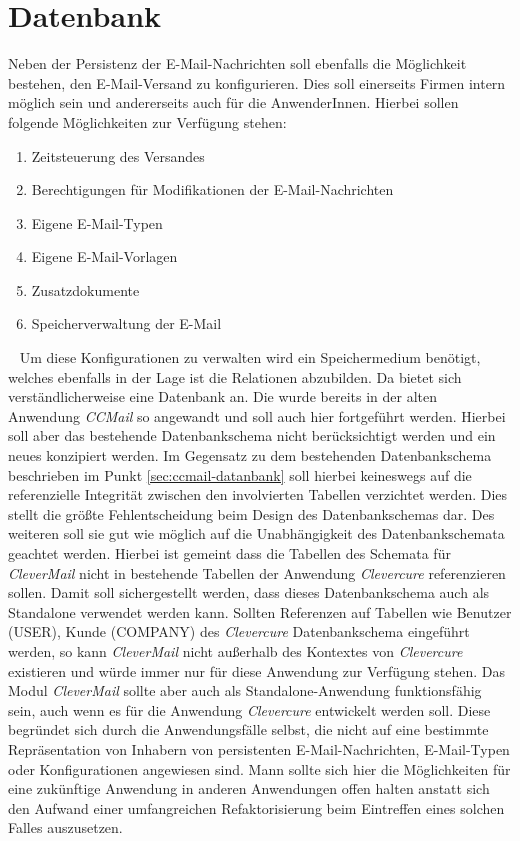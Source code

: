 \chapter{Datenbank}
Neben der Persistenz der E-Mail-Nachrichten soll ebenfalls die Möglichkeit bestehen, den E-Mail-Versand zu konfigurieren. Dies soll einerseits Firmen intern möglich sein und andererseits auch für die AnwenderInnen. Hierbei sollen folgende Möglichkeiten zur Verfügung stehen:
\begin{enumerate}
	\item Zeitsteuerung des Versandes
	\item Berechtigungen für Modifikationen der E-Mail-Nachrichten
	\item Eigene E-Mail-Typen
	\item Eigene E-Mail-Vorlagen
	\item Zusatzdokumente 
	\item Speicherverwaltung der E-Mail
\end{enumerate}
\ \newline
Um diese Konfigurationen zu verwalten wird ein Speichermedium benötigt, welches ebenfalls in der Lage ist die Relationen abzubilden. Da bietet sich verständlicherweise eine Datenbank an. Die wurde bereits in der alten Anwendung \emph{CCMail} so angewandt und soll auch hier fortgeführt werden. Hierbei soll aber das bestehende Datenbankschema nicht berücksichtigt werden und ein neues konzipiert werden. Im Gegensatz zu dem bestehenden Datenbankschema beschrieben im Punkt \ref{sec:ccmail-datanbank} soll hierbei keineswegs auf die referenzielle Integrität zwischen den involvierten Tabellen verzichtet werden. Dies stellt die größte Fehlentscheidung beim Design des Datenbankschemas dar. Des weiteren soll sie gut wie möglich auf die Unabhängigkeit des Datenbankschemata geachtet werden. Hierbei ist gemeint dass die Tabellen des Schemata für \emph{CleverMail} nicht in bestehende Tabellen der Anwendung \emph{Clevercure} referenzieren sollen. Damit soll sichergestellt werden, dass dieses Datenbankschema auch als Standalone verwendet werden kann. Sollten Referenzen auf Tabellen wie Benutzer (USER), Kunde (COMPANY) des \emph{Clevercure} Datenbankschema eingeführt werden, so kann \emph{CleverMail} nicht außerhalb des Kontextes von \emph{Clevercure} existieren und würde immer nur für diese Anwendung zur Verfügung stehen. Das Modul \emph{CleverMail} sollte aber auch als Standalone-Anwendung funktionsfähig sein, auch wenn es für die Anwendung \emph{Clevercure} entwickelt werden soll. Diese begründet sich durch die Anwendungsfälle selbst, die nicht auf eine bestimmte Repräsentation von Inhabern von persistenten E-Mail-Nachrichten, E-Mail-Typen oder Konfigurationen angewiesen sind. Mann sollte sich hier die Möglichkeiten für eine zukünftige Anwendung in anderen Anwendungen offen halten anstatt sich den Aufwand einer umfangreichen Refaktorisierung beim Eintreffen eines solchen Falles auszusetzen. 
